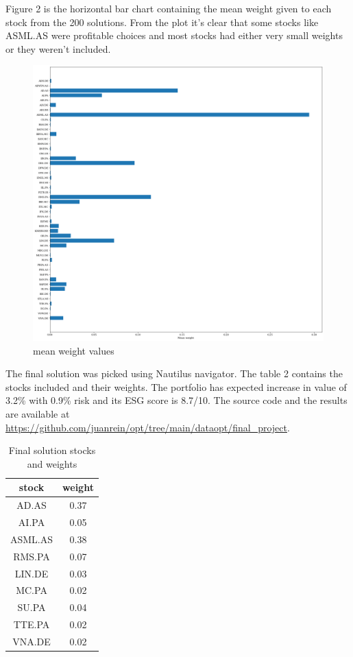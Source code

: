 \documentclass[11pt]{article} %
\begin{document}
Figure 2 is the horizontal bar chart containing the mean weight given to each stock from the 200 solutions. From the plot it's clear that some stocks like ASML.AS were profitable choices and most stocks had either very small weights or they weren't included. 

\begin{figure}[H]
\caption{mean weight values}
\hspace*{-1.5cm}
\includegraphics[scale=0.45]{meanW}
\end{figure}

The final solution was picked using Nautilus navigator. The table 2 contains the stocks included and their weights. The portfolio has expected increase in value of 3.2\% with 0.9\% risk and its ESG score is 8.7/10. The source code and the results are available at \url{https://github.com/juanrein/opt/tree/main/dataopt/final_project}.

\begin{table}[H]
\begin{tabular}{| c | c |}
\hline
stock & weight\\
\hline
AD.AS & 0.37\\
AI.PA & 0.05\\
ASML.AS & 0.38\\
RMS.PA & 0.07\\
LIN.DE & 0.03\\
MC.PA & 0.02\\
SU.PA & 0.04\\
TTE.PA & 0.02\\
VNA.DE & 0.02\\
\hline
\end{tabular}
\caption{Final solution stocks and weights}
\end{table}


\printbibliography %
\end{document}
